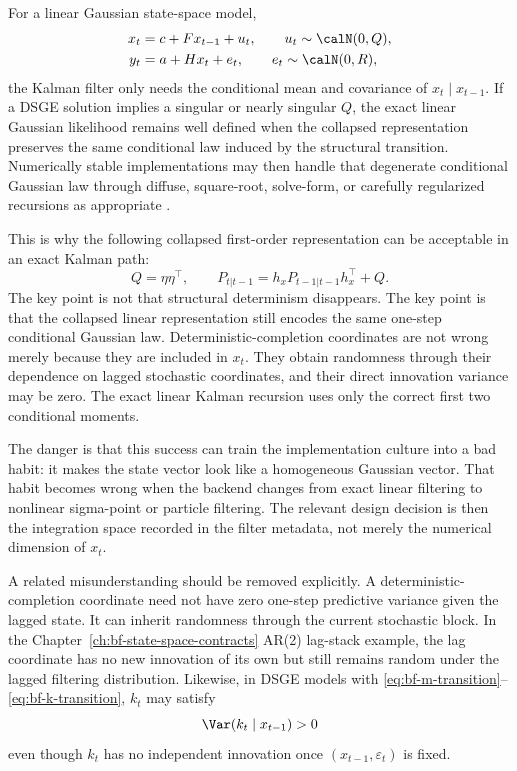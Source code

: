 For a linear Gaussian state-space model,
\begin{align}
  x_t &= c + F x_{t-1} + u_t,\qquad u_t \sim \calN(0,Q),\\
  y_t &= a + H x_t + e_t,\qquad e_t \sim \calN(0,R),
\end{align}
the Kalman filter only needs the conditional mean and covariance of
$x_t\mid x_{t-1}$.  If a DSGE solution implies a singular or nearly singular
$Q$, the exact linear Gaussian likelihood remains well defined when the
collapsed representation preserves the same conditional law induced by the
structural transition.  Numerically stable implementations may then handle that
degenerate conditional Gaussian law through diffuse, square-root, solve-form,
or carefully regularized recursions as appropriate \citep{durbin2012time}.

This is why the following collapsed first-order representation can be
acceptable in an exact Kalman path:
\[
  Q = \eta \eta^\top,\qquad
  P_{t|t-1} = h_x P_{t-1|t-1} h_x^\top + Q.
\]
The key point is not that structural determinism disappears.  The key point is
that the collapsed linear representation still encodes the same one-step
conditional Gaussian law.  Deterministic-completion coordinates are not wrong
merely because they are included in $x_t$.  They obtain randomness through
their dependence on lagged stochastic coordinates, and their direct innovation
variance may be zero.  The exact linear Kalman recursion uses only the correct
first two conditional moments.

The danger is that this success can train the implementation culture into a
bad habit: it makes the state vector look like a homogeneous Gaussian vector.
That habit becomes wrong when the backend changes from exact linear filtering
to nonlinear sigma-point or particle filtering.  The relevant design decision
is then the integration space recorded in the filter metadata, not merely the
numerical dimension of $x_t$.

A related misunderstanding should be removed explicitly.  A deterministic-
completion coordinate need not have zero one-step predictive variance given the
lagged state.  It can inherit randomness through the current stochastic block.
In the Chapter~\ref{ch:bf-state-space-contracts} AR(2) lag-stack example, the
lag coordinate has no new innovation of its own but still remains random under
the lagged filtering distribution.  Likewise, in DSGE models with
\eqref{eq:bf-m-transition}--\eqref{eq:bf-k-transition}, $k_t$ may satisfy
\begin{equation}
  \Var(k_t\mid x_{t-1}) > 0
\end{equation}
even though $k_t$ has no independent innovation once $(x_{t-1},\varepsilon_t)$
is fixed.

